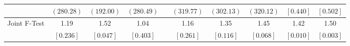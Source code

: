 \begin{tabular}{lccccccccc}
 & $ \left(280.28\right) $  & $ \left(192.00\right) $  & $ \left(280.49\right) $ &  & $ \left(319.77\right) $  & $ \left(302.13\right) $  & $ \left(320.12\right) $  & $ \left[ 0.440\right] $  & $ \left[ 0.502\right] $  \\ [0.25em] 
 \midrule 
 \multirow{2}{*}{Joint F-Test}  &   1.19 &   1.52 &   1.04 & &   1.16 &   1.35 &   1.45 &   1.42 &   1.50 \\ 
 & $ \left[ 0.236 \right] $  & $ \left[ 0.047 \right] $  & $ \left[ 0.403 \right] $  & & $ \left[ 0.261 \right] $  & $ \left[ 0.116 \right] $  & $ \left[ 0.068 \right] $  & $ \left[ 0.010\right] $  & $ \left[ 0.003\right] $ \\ [0.25em]
 \bottomrule 
 \end{tabular}
